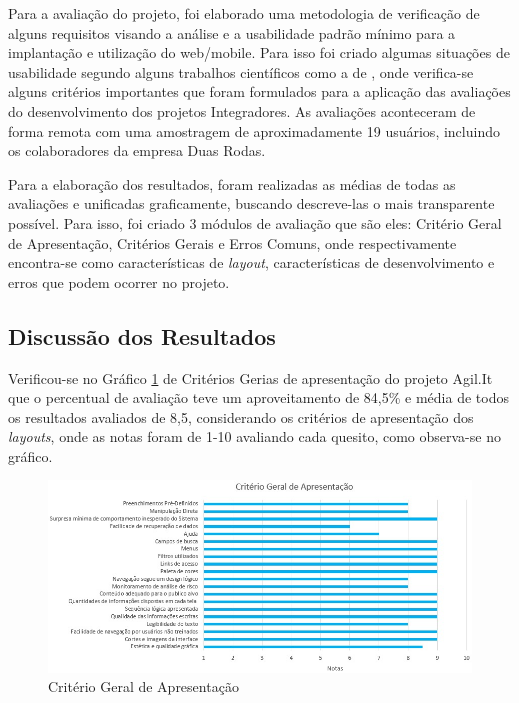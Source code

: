 Para a avaliação do projeto, foi elaborado uma metodologia de verificação de alguns requisitos visando a análise e a usabilidade padrão mínimo para a implantação e utilização do web/mobile. Para isso foi criado algumas situações de usabilidade segundo alguns trabalhos científicos como a de \cite{silva2016principios}, onde verifica-se alguns critérios importantes que foram formulados para a aplicação das avaliações do desenvolvimento dos projetos Integradores. As avaliações aconteceram de forma remota com uma amostragem de aproximadamente 19 usuários, incluindo os colaboradores da empresa Duas Rodas.

Para a elaboração dos resultados, foram realizadas as médias de todas as avaliações e unificadas graficamente, buscando descreve-las o mais transparente possível. Para isso, foi criado 3 módulos de avaliação que são eles: Critério Geral de Apresentação, Critérios Gerais e Erros Comuns, onde respectivamente encontra-se como características de \textit{layout}, características de desenvolvimento e erros que podem ocorrer no projeto.

\subsection{Discussão dos Resultados}

Verificou-se no Gráfico \ref{criterio-geral-apresentacao} de Critérios Gerias de apresentação do projeto Agil.It que o percentual de avaliação teve um aproveitamento de 84,5\% e média de todos os resultados avaliados de 8,5, considerando os critérios de apresentação dos \textit{layouts}, onde as notas foram de 1-10 avaliando cada quesito, como observa-se no gráfico.

\begin{landscape}
\begin{figure}[H]
	\caption{\label{criterio-geral-apresentacao}Critério Geral de Apresentação}
	\begin{center}
		\includegraphics[scale=0.90]{./Figuras/cap-testes/criterio-geral-apresentacao.jpeg}
	\end{center}
\end{figure}
\end{landscape}

